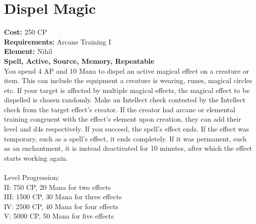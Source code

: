 \section{Dispel Magic}
\textbf{Cost:} 250 CP\\
\textbf{Requirements:} Arcane Training I\\
\textbf{Element:} Nihil\\
\textbf{Spell, Active, Source, Memory, Repeatable}\\
You spend 4 AP and 10 Mana to dispel an active magical effect on a creature or item. This can include the equipment a creature is wearing, runes, magical circles etc. If your target is affected by multiple magical effects, the magical effect to be dispelled is chosen randomly. Make an Intellect check contested by the Intellect check from the target effect's creator. If the creator had arcane or elemental training congruent with the effect's element upon creation, they can add their level and d4s respectively. If you succeed, the spell's effect ends. If the effect was temporary, such as a spell's effect, it ends completely. If it was permanent, such as an enchantment, it is instead deactivated for 10 minutes, after which the effect starts working again.\\
\\
Level Progression:\\
II: 750 CP, 20 Mana for two effects\\
III: 1500 CP, 30 Mana for three effects\\
IV: 2500 CP, 40 Mana for four effects\\
V: 5000 CP, 50 Mana for five effects\\